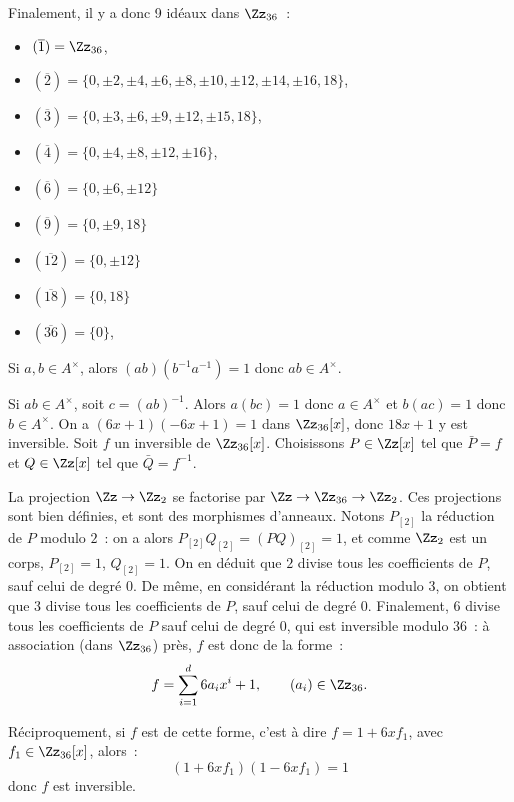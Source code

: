 {\begin{enumerate}
{Finalement, il y a donc 9 idéaux dans $\Zz_{36}$~:
\begin{itemize}
\item $(\overline{ 1})=\Zz_{36}$,
\item $(\overline{ 2})=\{0,\pm2,\pm4,\pm6,\pm8,\pm10,\pm12,\pm14,\pm16,18\}$,
\item $(\overline{ 3})=\{0,\pm3,\pm6,\pm9,\pm12,\pm15,18\}$,
\item $(\overline{ 4})=\{0,\pm4,\pm8,\pm12,\pm16\}$,
\item $(\overline{ 6})=\{0,\pm6,\pm12\}$
\item $(\overline{ 9})=\{0,\pm9,18\}$
\item $(\overline{12})=\{0,\pm12\}$
\item $(\overline{18})=\{0,18\}$
\item $(\overline{36})=\{0\}$,
\end{itemize}
Si $a,b\in A^{\times}$, alors $(a b)(b^{-1} a^{-1})=1$ donc $ab\in
A^{\times}$.

Si $ab\in A^{\times}$, soit $c=(ab)^{-1}$. Alors $a(bc)=1$ donc $a\in
A^{\times}$ et $b(ac)=1$ donc $b\in A^{\times}$.
On a $(6x+1)(-6x+1)=1$ dans $\Zz_{36}[x]$, donc $18x+1$ y est inversible.
Soit $f$ un inversible de $\Zz_{36}[x]$. Choisissons $P\in\Zz[x]$ tel que
$\bar{P}=f$ et $Q\in\Zz[x]$ tel que $\bar{Q}=f^{-1}$.

La projection $\Zz\to\Zz_{2}$ se factorise par
$\Zz\to\Zz_{36}\to\Zz_{2}$. Ces projections sont bien définies, et sont
des morphismes d'anneaux. Notons $P_{[2]}$ la réduction de $P$ modulo
$2$~: on a alors $P_{[2]}Q_{[2]}=(PQ)_{[2]}=1$, et comme $\Zz_{2}$ est un
corps, $P_{[2]}=1$, $Q_{[2]}=1$. On en déduit que $2$ divise tous les
coefficients de $P$, sauf celui de degré $0$. De même, en considérant la
réduction modulo $3$, on obtient que $3$ divise tous les coefficients de
$P$, sauf celui de degré $0$. Finalement, $6$ divise tous les
coefficients de $P$ sauf celui de degré $0$, qui est inversible modulo
$36$~: à association (dans $\Zz_{36}$) près, $f$ est donc de la forme~:
$$
f=\sum_{i=1}^{d} 6a_{i} x^{i}+1,\qquad (a_{i})\in\Zz_{36}.
$$

Réciproquement, si $f$ est de cette forme, c'est à dire  $f=1+6xf_{1}$,
avec $f_{1}\in\Zz_{36}[x]$, alors~:
$$
 (1+6xf_{1})(1-6xf_{1})=1
$$
donc $f$ est inversible.
}
\end{enumerate}
}
